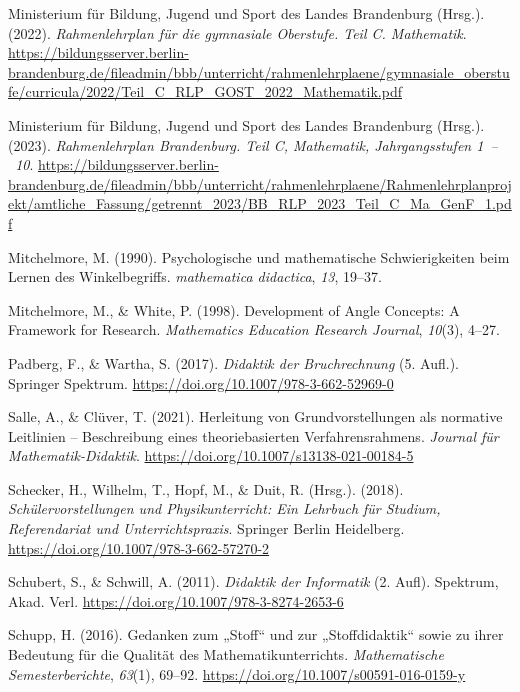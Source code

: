 \documentclass[
]{scrbook}
\newlength{\cslhangindent}
\newenvironment{CSLReferences}[2] %
 {\begin{list}{}{%
  \setlength{\itemindent}{0pt}
  \setlength{\leftmargin}{0pt}
  \setlength{\parsep}{0pt}
  \ifodd #1
   \setlength{\leftmargin}{\cslhangindent}
   \setlength{\itemindent}{-1\cslhangindent}
  \fi
  \setlength{\itemsep}{#2\baselineskip}}}
 {\end{list}}
\theoremstyle{definition}
\theoremstyle{definition}
\theoremstyle{definition}
\theoremstyle{definition}
\theoremstyle{remark}
\begin{document}
\begin{CSLReferences}{1}{0}
Ministerium für Bildung, Jugend und Sport des Landes Brandenburg (Hrsg.). (2022). \emph{Rahmenlehrplan für die gymnasiale {Oberstufe}. {Teil} {C}. {Mathematik}}. \url{https://bildungsserver.berlin-brandenburg.de/fileadmin/bbb/unterricht/rahmenlehrplaene/gymnasiale_oberstufe/curricula/2022/Teil_C_RLP_GOST_2022_Mathematik.pdf}

Ministerium für Bildung, Jugend und Sport des Landes Brandenburg (Hrsg.). (2023). \emph{Rahmenlehrplan {Brandenburg}. {Teil} {C}, {Mathematik}, {Jahrgangsstufen} 1~--~10}. \url{https://bildungsserver.berlin-brandenburg.de/fileadmin/bbb/unterricht/rahmenlehrplaene/Rahmenlehrplanprojekt/amtliche_Fassung/getrennt_2023/BB_RLP_2023_Teil_C_Ma_GenF_1.pdf}

Mitchelmore, M. (1990). Psychologische und mathematische Schwierigkeiten beim Lernen des Winkelbegriffs. \emph{mathematica didactica}, \emph{13}, 19--37.

Mitchelmore, M., \& White, P. (1998). Development of {Angle} {Concepts}: {A} {Framework} for {Research}. \emph{Mathematics Education Research Journal}, \emph{10}(3), 4--27.

Padberg, F., \& Wartha, S. (2017). \emph{Didaktik der {Bruchrechnung}} (5. Aufl.). Springer Spektrum. \url{https://doi.org/10.1007/978-3-662-52969-0}

Salle, A., \& Clüver, T. (2021). Herleitung von {Grundvorstellungen} als normative {Leitlinien} -- {Beschreibung} eines theoriebasierten {Verfahrensrahmens}. \emph{Journal für Mathematik-Didaktik}. \url{https://doi.org/10.1007/s13138-021-00184-5}

Schecker, H., Wilhelm, T., Hopf, M., \& Duit, R. (Hrsg.). (2018). \emph{Schülervorstellungen und {Physikunterricht}: {Ein} {Lehrbuch} für {Studium}, {Referendariat} und {Unterrichtspraxis}}. Springer Berlin Heidelberg. \url{https://doi.org/10.1007/978-3-662-57270-2}

Schubert, S., \& Schwill, A. (2011). \emph{Didaktik der {Informatik}} (2. Aufl). Spektrum, Akad. Verl. \url{https://doi.org/10.1007/978-3-8274-2653-6}

Schupp, H. (2016). Gedanken zum „{Stoff}`` und zur „{Stoffdidaktik}`` sowie zu ihrer {Bedeutung} für die {Qualität} des {Mathematikunterrichts}. \emph{Mathematische Semesterberichte}, \emph{63}(1), 69--92. \url{https://doi.org/10.1007/s00591-016-0159-y}


\end{CSLReferences}
\end{document}
